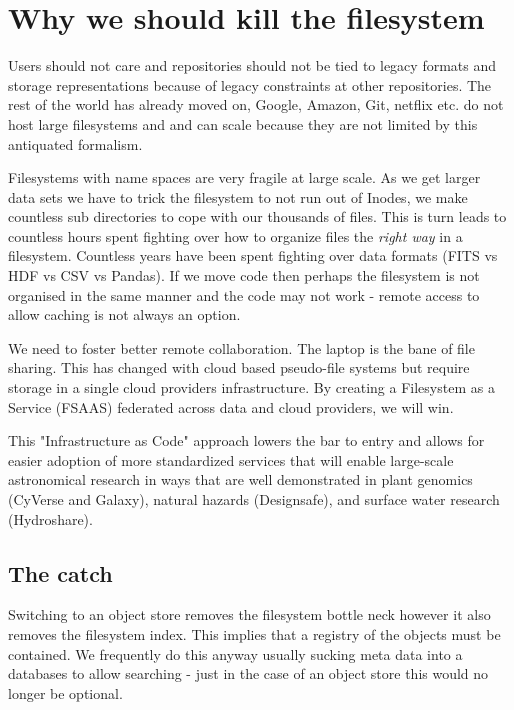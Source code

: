 \section{Why we should kill the filesystem}

Users should not care and repositories should not be tied to legacy formats  and storage representations because of legacy constraints  at other repositories.
The rest of the world has already moved on,  Google, Amazon, Git, netflix etc. do not host large filesystems and and can scale because they are not limited by this antiquated formalism.


Filesystems with name spaces are very fragile at large scale. As we get larger data sets we have to trick the filesystem to not run out of Inodes, we make countless sub directories to cope with our thousands of files.
This is turn leads to countless hours spent fighting over how to organize files  the \emph{right way} in a filesystem.
Countless years have been spent fighting over data formats (\gls{FITS} vs \gls{HDF} vs \gls{CSV} vs Pandas).
If we move code then perhaps the filesystem is not organised in the same manner and the code may not work - remote access to allow caching is not always an option.

We need to foster better remote collaboration.  The laptop is the bane of file sharing.
This has changed with cloud based pseudo-file systems but require storage in a single
cloud providers infrastructure. By creating a Filesystem as a Service (\gls{FSAAS}) federated
across data and cloud providers, we will win.


This "Infrastructure as Code" \citep{morris2016infrastructure} approach lowers the bar to entry
and allows for easier adoption of more standardized services that will enable large-scale
astronomical research in ways that are well demonstrated in plant genomics (CyVerse and Galaxy), natural hazards (Designsafe), and surface water research (Hydroshare).

\subsection{The catch }
Switching to an object store removes the filesystem bottle neck however it also removes the filesystem index. This implies that a registry of the objects must be contained. We frequently do this anyway usually sucking meta data into a databases to allow searching - just in the case of an object store this would no longer be  optional.

